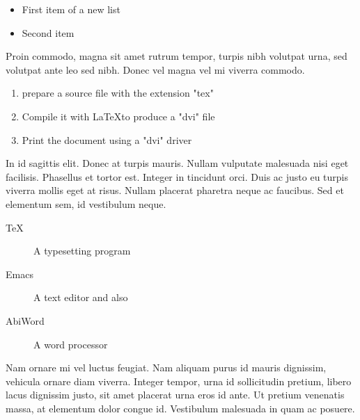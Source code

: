 \documentclass{article}
\begin{document}
{\renewcommand{\labelitemi}{$\triangleright$}
\begin{itemize}
\item First item of a new list
\item Second item
\end{itemize}}

\pagebreak

Proin commodo, magna sit amet rutrum tempor, turpis nibh volutpat urna, sed volutpat
ante leo sed nibh. Donec vel magna vel mi viverra commodo.

\begin{enumerate}
\item prepare a source file with the extension "tex"
\item Compile it with \LaTeX to produce a "dvi" file
\item Print the document using a "dvi" driver
\end{enumerate}

In id sagittis elit. Donec at turpis mauris. Nullam vulputate malesuada nisi eget
facilisis. Phasellus et tortor est. Integer in tincidunt orci. Duis ac justo eu
turpis viverra mollis eget at risus. Nullam placerat pharetra neque ac faucibus. Sed
et elementum sem, id vestibulum neque.

\begin{description}
\item[\TeX] A typesetting program
\item[Emacs] A text editor and also
\item[AbiWord] A word processor
\end{description}

Nam ornare mi vel luctus feugiat. Nam aliquam purus id mauris dignissim, vehicula
ornare diam viverra. Integer tempor, urna id sollicitudin pretium, libero lacus
dignissim justo, sit amet placerat urna eros id ante. Ut pretium venenatis massa, at
elementum dolor congue id. Vestibulum malesuada in quam ac posuere.
\end{document}

